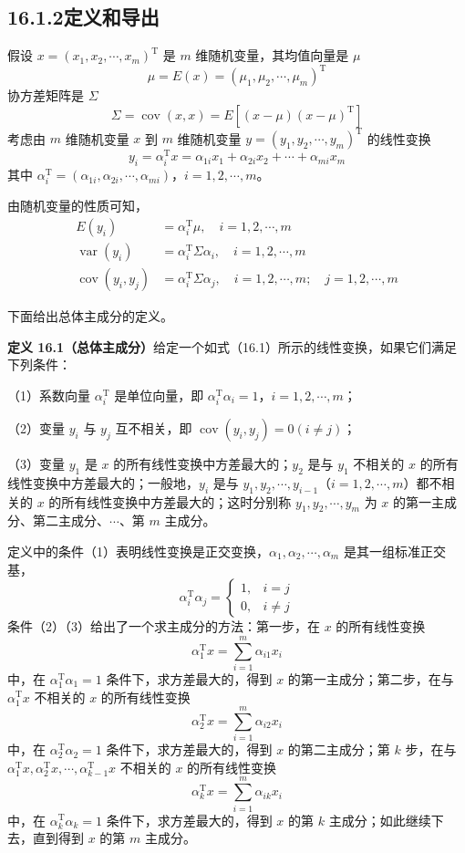 \documentclass[UTF8,12pt,a4paper,fontset=fandol]{ctexart}
\begin{document}
\subsection*{16.1.2\quad 定义和导出}

假设 $x=(x_1,x_2,\cdots,x_m)^{\mathrm{T}}$ 是 $m$ 维随机变量，其均值向量是 $\mu$
\[
\mu=E(x)=(\mu_1,\mu_2,\cdots,\mu_m)^{\mathrm{T}}
\]
协方差矩阵是 $\Sigma$
\[
\Sigma=\operatorname{cov}(x,x)=E[(x-\mu)(x-\mu)^{\mathrm{T}}]
\]
考虑由 $m$ 维随机变量 $x$ 到 $m$ 维随机变量 $y=(y_1,y_2,\cdots,y_m)^{\mathrm{T}}$ 的线性变换
\begin{equation}
y_i=\alpha_i^{\mathrm{T}}x=\alpha_{1i}x_1+\alpha_{2i}x_2+\cdots+\alpha_{mi}x_m
\tag{16.1}
\end{equation}
其中 $\alpha_i^{\mathrm{T}}=(\alpha_{1i},\alpha_{2i},\cdots,\alpha_{mi})$，$i=1,2,\cdots,m$。

由随机变量的性质可知，
\begin{align}
E(y_i)&=\alpha_i^{\mathrm{T}}\mu,\quad i=1,2,\cdots,m \tag{16.2}\\
\operatorname{var}(y_i)&=\alpha_i^{\mathrm{T}}\Sigma\alpha_i,\quad i=1,2,\cdots,m \tag{16.3}\\
\operatorname{cov}(y_i,y_j)&=\alpha_i^{\mathrm{T}}\Sigma\alpha_j,\quad i=1,2,\cdots,m;\quad j=1,2,\cdots,m \tag{16.4}
\end{align}

下面给出总体主成分的定义。

\noindent\textbf{定义 16.1（总体主成分）}\quad 给定一个如式（16.1）所示的线性变换，如果它们满足下列条件：

（1）系数向量 $\alpha_i^{\mathrm{T}}$ 是单位向量，即 $\alpha_i^{\mathrm{T}}\alpha_i=1$，$i=1,2,\cdots,m$；

（2）变量 $y_i$ 与 $y_j$ 互不相关，即 $\operatorname{cov}(y_i,y_j)=0(i\neq j)$；

（3）变量 $y_1$ 是 $x$ 的所有线性变换中方差最大的；$y_2$ 是与 $y_1$ 不相关的 $x$ 的所有线性变换中方差最大的；一般地，$y_i$ 是与 $y_1,y_2,\cdots,y_{i-1}$（$i=1,2,\cdots,m$）都不相关的 $x$ 的所有线性变换中方差最大的；这时分别称 $y_1,y_2,\cdots,y_m$ 为 $x$ 的第一主成分、第二主成分、$\cdots$、第 $m$ 主成分。

定义中的条件（1）表明线性变换是正交变换，$\alpha_1,\alpha_2,\cdots,\alpha_m$ 是其一组标准正交基，
\[
\alpha_i^{\mathrm{T}}\alpha_j=
\begin{cases}
1, & i=j\\
0, & i\neq j
\end{cases}
\]
条件（2）（3）给出了一个求主成分的方法：第一步，在 $x$ 的所有线性变换
\[
\alpha_1^{\mathrm{T}}x=\sum_{i=1}^m\alpha_{i1}x_i
\]
中，在 $\alpha_1^{\mathrm{T}}\alpha_1=1$ 条件下，求方差最大的，得到 $x$ 的第一主成分；第二步，在与 $\alpha_1^{\mathrm{T}}x$ 不相关的 $x$ 的所有线性变换
\[
\alpha_2^{\mathrm{T}}x=\sum_{i=1}^m\alpha_{i2}x_i
\]
中，在 $\alpha_2^{\mathrm{T}}\alpha_2=1$ 条件下，求方差最大的，得到 $x$ 的第二主成分；第 $k$ 步，在与 $\alpha_1^{\mathrm{T}}x,\alpha_2^{\mathrm{T}}x,\cdots,\alpha_{k-1}^{\mathrm{T}}x$ 不相关的 $x$ 的所有线性变换
\[
\alpha_k^{\mathrm{T}}x=\sum_{i=1}^m\alpha_{ik}x_i
\]
中，在 $\alpha_k^{\mathrm{T}}\alpha_k=1$ 条件下，求方差最大的，得到 $x$ 的第 $k$ 主成分；如此继续下去，直到得到 $x$ 的第 $m$ 主成分。
\end{document}
